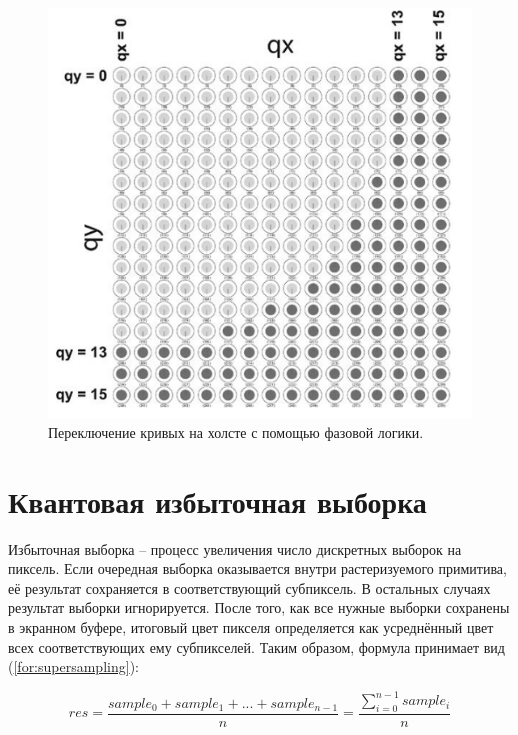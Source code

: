 \begin{figure}[h]
	\begin{center}
		\includegraphics[scale=0.57]{img/holst_03.png}
	\end{center}
	\captionsetup{justification=centering}
	\caption{Переключение кривых на холсте с помощью фазовой логики.}
	\label{for:holst_03}
\end{figure}

\section{Квантовая избыточная выборка}

Избыточная выборка -- процесс увеличения число дискретных выборок на пиксель. Если очередная выборка оказывается внутри растеризуемого примитива, её результат сохраняется в соответствующий субпиксель. В остальных случаях результат выборки игнорируется. После того, как все нужные выборки сохранены в экранном буфере, итоговый цвет пикселя определяется как усреднённый цвет всех соответствующих ему субпикселей. Таким образом, формула принимает вид (\ref{for:supersampling}): 

\begin{equation}
	\label{for:supersampling}
	res = \frac{sample_{0} + sample_{1} + ... + sample_{n-1}}{n} = \frac{\sum_{i=0}^{n - 1} sample_{i}}{n}
\end{equation}

